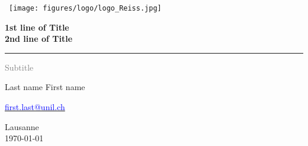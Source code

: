 
\begin{titlepage}
\begin{singlespace}

\begin{center}
\hbox{\hspace{-3cm} \texttt{[image: figures/logo/logo\_Reiss.jpg]}}
\end{center}
\vspace*{1cm}

\Huge %
\textbf{1st line of Title\\ 2nd line of Title}\\
\rule{5cm}{0.2pt}

\LARGE
\textcolor{gray}{
Subtitle\\
}
\vspace{2cm}

Last name First name

\large

\href{mailto:first.last@unil.ch}{\textcolor{blue}{first.last@unil.ch}}

\vfill


Lausanne\\
\today

\end{singlespace}
\end{titlepage}
\restoregeometry